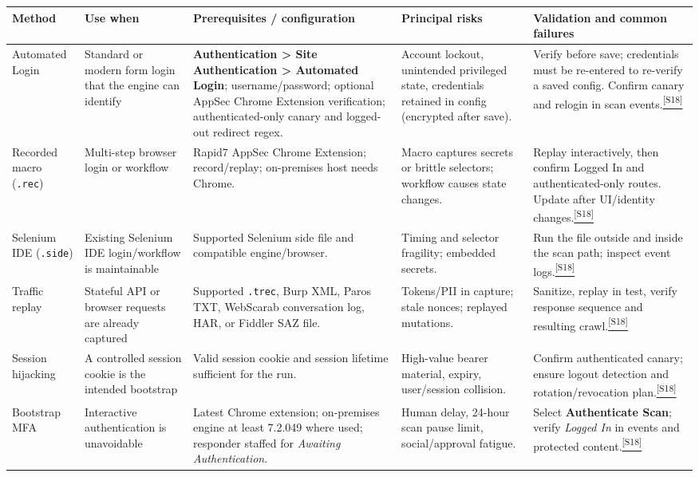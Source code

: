 \documentclass[11pt,letterpaper,oneside]{scrreprt}
\newcommand{\src}[1]{\hyperref[src:#1]{\textsuperscript{\color{R7Orange}[#1]}}}
\newcommand{\uipath}[1]{\textsf{\textbf{#1}}}
\newcommand{\code}[1]{\texttt{#1}}
\begin{document}
\begin{landscape}
\begin{longtable}{@{}P{1.10in}P{1.25in}P{1.95in}P{1.95in}P{2.05in}@{}}
\toprule
\textbf{Method} & \textbf{Use when} & \textbf{Prerequisites / configuration} & \textbf{Principal risks} & \textbf{Validation and common failures}\\
\midrule
\endhead
Automated Login & Standard or modern form login that the engine can identify & \uipath{Authentication > Site Authentication > Automated Login}; username/password; optional AppSec Chrome Extension verification; authenticated-only canary and logged-out redirect regex. & Account lockout, unintended privileged state, credentials retained in config (encrypted after save). & Verify before save; credentials must be re-entered to re-verify a saved config. Confirm canary and relogin in scan events.\src{S18}\\
Recorded macro (\code{.rec}) & Multi-step browser login or workflow & Rapid7 AppSec Chrome Extension; record/replay; on-premises host needs Chrome. & Macro captures secrets or brittle selectors; workflow causes state changes. & Replay interactively, then confirm Logged In and authenticated-only routes. Update after UI/identity changes.\src{S18}\\
Selenium IDE (\code{.side}) & Existing Selenium IDE login/workflow is maintainable & Supported Selenium side file and compatible engine/browser. & Timing and selector fragility; embedded secrets. & Run the file outside and inside the scan path; inspect event logs.\src{S18}\\
Traffic replay & Stateful API or browser requests are already captured & Supported \code{.trec}, Burp XML, Paros TXT, WebScarab conversation log, HAR, or Fiddler SAZ file. & Tokens/PII in capture; stale nonces; replayed mutations. & Sanitize, replay in test, verify response sequence and resulting crawl.\src{S18}\\
Session hijacking & A controlled session cookie is the intended bootstrap & Valid session cookie and session lifetime sufficient for the run. & High-value bearer material, expiry, user/session collision. & Confirm authenticated canary; ensure logout detection and rotation/revocation plan.\src{S18}\\
Bootstrap MFA & Interactive authentication is unavoidable & Latest Chrome extension; on-premises engine at least 7.2.049 where used; responder staffed for \emph{Awaiting Authentication}. & Human delay, 24-hour scan pause limit, social/approval fatigue. & Select \uipath{Authenticate Scan}; verify \emph{Logged In} in events and protected content.\src{S18}\\

\end{longtable}
\end{landscape}
\end{document}
